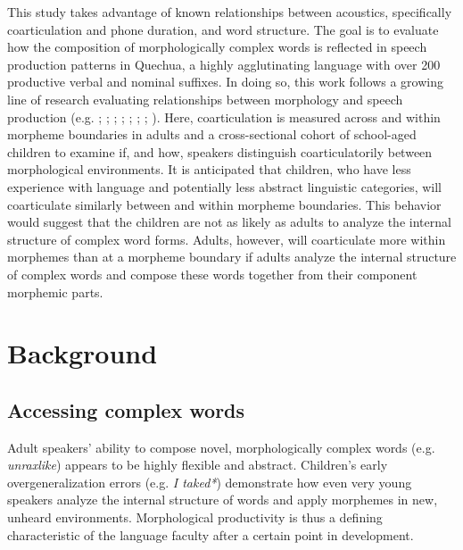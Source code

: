 \documentclass[a4paper,man,floatsintext,natbib,donotrepeattitle, apacite]{apa6}
\begin{document}
This study takes advantage of known relationships between acoustics, specifically coarticulation and phone duration, and word structure. The goal is to evaluate how the composition of morphologically complex words is reflected in speech production patterns in Quechua, a highly agglutinating language with over 200 productive verbal and nominal suffixes. In doing so, this work follows a growing line of research evaluating relationships between morphology and speech production (e.g. \citealt{choEffectsMorphemeBoundaries2001};  \citealt{hayCausesConsequencesWord2003}; \citealt{lee-kimMorphologicalEffectsDarkness2013}; 
\citealt{plagPhonologicalPhoneticVariability2014};  \citealt{songDurationalCuesFricative2013}; \citealt{songEffectsCoarticulationMorphological2013}; 
\citealt{strycharczukPhoneticDetailPhonetic2019};
\citealt{tomaschekHowAnticipatoryCoarticulation2019}). Here, coarticulation is measured across and within morpheme boundaries in adults and a cross-sectional cohort of school-aged children to examine if, and how, speakers distinguish coarticulatorily between morphological environments. It is anticipated that children, who have less experience with language and potentially less abstract linguistic categories, will coarticulate similarly between and within morpheme boundaries. This behavior would suggest that the children are not as likely as adults to analyze the internal structure of complex word forms. Adults, however, will coarticulate more within morphemes than at a morpheme boundary if adults analyze the internal structure of complex words and compose these words together from their component morphemic parts. 



\section{Background}


\subsection{Accessing complex words}

Adult speakers’ ability to compose novel, morphologically complex words (e.g. \textit{unraxlike}) appears to be highly flexible and abstract. Children’s early overgeneralization errors (e.g. \textit{I taked*}) demonstrate how even very young speakers analyze the internal structure of words and apply morphemes in new, unheard environments. Morphological productivity is thus a defining characteristic of the language faculty after a certain point in development. 
\end{document}
